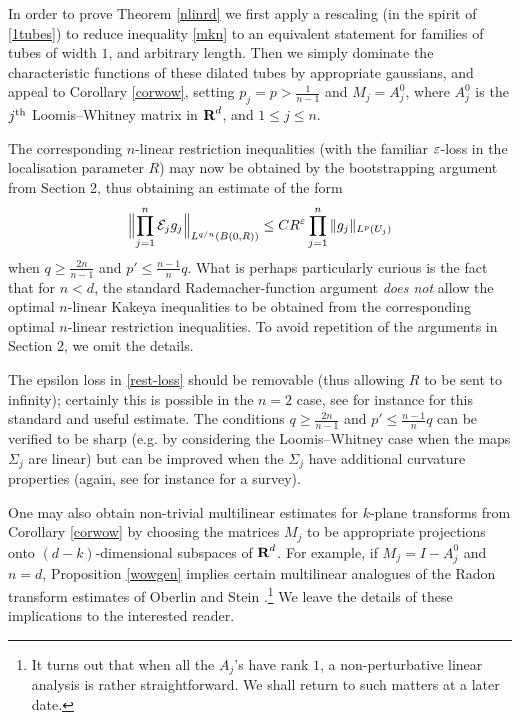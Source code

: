 In order to prove Theorem \ref{nlinrd} we first apply a rescaling
(in the spirit of \eqref{1tubes}) to reduce inequality \eqref{mkn}
to an equivalent statement for families of tubes of width $1$, and
arbitrary length. Then we simply dominate the characteristic
functions of these dilated tubes by appropriate gaussians, and
appeal to Corollary \ref{corwow}, setting $p_j=p>\tfrac{1}{n-1}$
and $M_j=A_{j}^{0}$, where $A_{j}^{0}$ is the $j^{\operatorname{th}}$
Loomis--Whitney matrix in ${\hbox{\bf R}}^d$, and $1\leq j\leq n$.

The corresponding $n$-linear restriction inequalities (with the
familiar $\varepsilon$-loss in the localisation parameter $R$) may
now be obtained by the bootstrapping argument from Section 2, thus obtaining an estimate of the form
\begin{equation}\label{rest-loss}
\Bigl\|\prod_{j=1}^{n}{\mathcal{E}}_{j}g_{j}\Bigr\|_{L^{q/n}(B(0,R))}\leq C
R^{\varepsilon}\prod_{j=1}^{n} \|g_{j}\|_{L^p(U_j)}
\end{equation}
when $q \geq \frac{2n}{n-1}$ and $p' \leq \frac{n-1}{n} q$.
What
is perhaps particularly curious is the fact that for $n<d$, the
standard Rademacher-function argument \textit{does not} allow the
optimal $n$-linear Kakeya inequalities to be obtained from the
corresponding optimal $n$-linear restriction inequalities.
To avoid
repetition of the arguments in Section 2, we omit the details.

\begin{remark}
The epsilon loss in \eqref{rest-loss} should be removable (thus allowing $R$ to be sent to infinity);
certainly this is possible in the $n=2$ case, see for instance \cite{TaoRestn} for this standard and useful
estimate.  The conditions
$q \geq \frac{2n}{n-1}$ and $p' \leq \frac{n-1}{n} q$ can be verified to be sharp (e.g. by considering the
Loomis--Whitney case when the maps $\Sigma_j$ are linear) but can be improved when the $\Sigma_j$ have additional
curvature properties (again, see for instance \cite{TaoRestn} for a survey).
\end{remark}

\begin{remark}
One may also obtain non-trivial multilinear estimates for
$k$-plane transforms from Corollary \ref{corwow} by choosing the
matrices $M_j$ to be appropriate projections onto
$(d-k)$-dimensional subspaces of ${\hbox{\bf R}}^d$. For example, if
$M_{j}=I-A_{j}^{0}$ and $n=d$, Proposition \ref{wowgen} implies
certain multilinear analogues of the Radon transform estimates of Oberlin
and Stein \cite{OS}.\footnote{It turns out that when all the
$A_j$'s have rank $1$, a non-perturbative linear analysis is
rather straightforward. We shall return to such matters at a later
date.} We leave the details of these implications to the
interested reader.
\end{remark}

